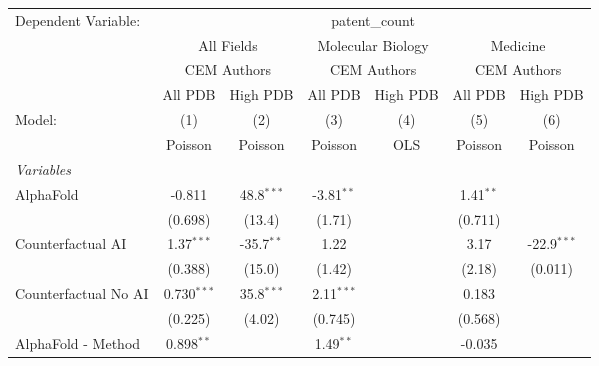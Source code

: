 \begingroup
\centering
\begin{tabular}{lcccccc}
   \tabularnewline \midrule \midrule
   Dependent Variable: & \multicolumn{6}{c}{patent\_count}\\
 & \multicolumn{2}{c}{All Fields} & \multicolumn{2}{c}{Molecular Biology} & \multicolumn{2}{c}{Medicine} \\
\cmidrule(lr){2-3} \cmidrule(lr){4-5} \cmidrule(lr){6-7}
 & \multicolumn{2}{c}{CEM Authors} & \multicolumn{2}{c}{CEM Authors} & \multicolumn{2}{c}{CEM Authors} \\
\cmidrule(lr){2-3} \cmidrule(lr){4-5} \cmidrule(lr){6-7}
 & \multicolumn{1}{c}{All PDB} & \multicolumn{1}{c}{High PDB} & \multicolumn{1}{c}{All PDB} & \multicolumn{1}{c}{High PDB} & \multicolumn{1}{c}{All PDB} & \multicolumn{1}{c}{High PDB} \\
\cmidrule(lr){2-2} \cmidrule(lr){3-3} \cmidrule(lr){4-4} \cmidrule(lr){5-5} \cmidrule(lr){6-6} \cmidrule(lr){7-7}
   Model:                                                     & (1)           & (2)          & (3)           & (4)  & (5)           & (6)\\  
                                                              &  Poisson      & Poisson      & Poisson       & OLS  & Poisson       & Poisson\\  
   \midrule
   \emph{Variables}\\
   AlphaFold                                                  & -0.811        & 48.8$^{***}$ & -3.81$^{**}$  &      & 1.41$^{**}$   &   \\   
                                                              & (0.698)       & (13.4)       & (1.71)        &      & (0.711)       &   \\   
   Counterfactual AI                                          & 1.37$^{***}$  & -35.7$^{**}$ & 1.22          &      & 3.17          & -22.9$^{***}$\\   
                                                              & (0.388)       & (15.0)       & (1.42)        &      & (2.18)        & (0.011)\\   
   Counterfactual No AI                                       & 0.730$^{***}$ & 35.8$^{***}$ & 2.11$^{***}$  &      & 0.183         &   \\   
                                                              & (0.225)       & (4.02)       & (0.745)       &      & (0.568)       &   \\   
   AlphaFold - Method                                         & 0.898$^{**}$  &              & 1.49$^{**}$   &      & -0.035        &   \\   

\end{tabular}
